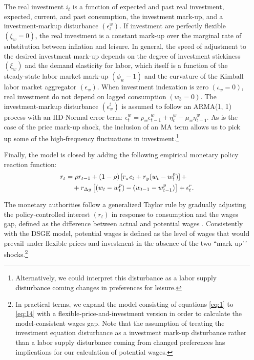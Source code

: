 \documentclass[11pt]{article}
\newcommand{\yobs}[1]{w_{#1}}
\newcommand{\wobs}[1]{i_{#1}}
\newcommand{\robs}[1]{r_{#1}}
\newcommand{\piobs}[1]{c_{#1}}
\newcommand{\youtput}{wages}
\newcommand{\consumption}{inflation}
\newcommand{\labor}{labor}
\newcommand{\interest}{interest}
\newcommand{\wage}{investment}
\newcommand{\wages}{investment}
\newcommand{\price}{price}
\newcommand{\prices}{prices}
\newcommand{\inflation}{consumption}
\newcommand{\leisure}{leisure}
\begin{document}
The real \wage{} \(\wobs{t}\) is a function of expected and past real
\wages, expected, current, and past \inflation, the \wage{} mark-up, and
a \wage-markup disturbance \((\epsilon^w_t)\). If \wages{} are perfectly
flexible \((\xi_w = 0)\), the real \wage{} is a constant mark-up over
the marginal rate of substitution between \consumption{} and \leisure{}.
In general, the speed of adjustment to the desired \wage{} mark-up
depends on the degree of \wage{} stickiness \((\xi_w)\) and the demand
elasticity for \labor, which itself is a function of the steady-state
\labor{} market mark-up \((\phi_w - 1)\) and the curvature of the
Kimball \labor{} market aggregator \((\epsilon_w)\). When \wage{}
indexation is zero \((\iota_w =0)\), real \wages{} do not depend on
lagged \inflation{} \((w_3 = 0)\). The \wage{}-markup disturbance
\((\epsilon_w^t)\) is assumed to follow an ARMA(1, 1) process with an
IID-Normal error term:
\(\epsilon_t^w = \rho_w \epsilon_{t-1}^w + \eta_t^w - \mu_w \eta_{t-1}^w\).
As is the case of the \price{} mark-up shock, the inclusion of an MA
term allows us to pick up some of the high-frequency fluctuations in
\wages{}.\footnote{Alternatively, we
  could interpret this disturbance as a \labor{} supply disturbance
  coming changes in preferences for \leisure{}.}

Finally, the model is closed by adding the following empirical monetary
policy reaction function: \begin{align}
  \label{eq:14}
  \robs{t} &= \rho\robs{t-1} + (1-\rho)\left[r_\pi \piobs{t} +
  r_y(\yobs{t}-\yobs{t}^p)\right]+\\ &\quad + r_{\Delta y}\left[(\yobs{t}-\yobs{t}^{p}) -
  (\yobs{t-1} - \yobs{t-1}^{p})\right] + \epsilon_t^r.\notag
\end{align}

The monetary authorities follow a generalized Taylor rule by gradually
adjusting the policy-controlled \interest{} \((\robs{t})\) in response
to \inflation{} and the \youtput{} gap, defined as the difference
between actual and potential \youtput{} \citep{Taylor-on-Taylor-rule}.
Consistently with the DSGE model, potential \youtput{} is defined as the
level of \youtput{} that would prevail under flexible \prices{} and
\wages{} in the absence of the two ``mark-up'\,'
shocks.\footnote{In practical
  terms, we expand the model consisting of equations \eqref{eq:1} to
  \eqref{eq:14} with a flexible-\price-and-\wage{} version in order to
  calculate the model-consistent \youtput{} gap. Note that the assumption
  of treating the \wage{} equation disturbance as a \wage{} mark-up
  disturbance rather than a \labor{} supply disturbance coming from
  changed preferences has implications for our calculation of
  potential \youtput{}. }
\end{document}
